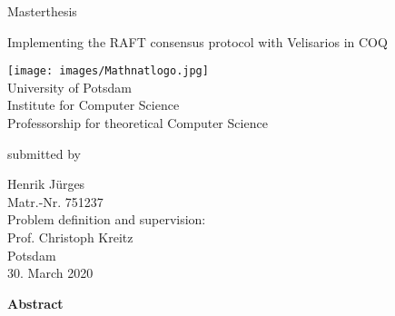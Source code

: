 \documentclass[11pt, a4paper]{article}
\begin{document}
          

\begin{titlepage}
  \begin{center} 
    \mbox{}
    
    {\large \sc Masterthesis} \\    

    \vspace{1cm}
  
    {\huge Implementing the RAFT consensus protocol with Velisarios in COQ\\[1em] {\LARGE}}  
        
    \vspace{2cm}
    
    \texttt{[image: images/Mathnatlogo.jpg]}\\[1em]
    University of Potsdam\\
    Institute for Computer Science\\
    Professorship for theoretical Computer Science
    
    \vspace{2cm}
    
		submitted by
		
    \vspace{1em}
    
		{\Large Henrik Jürges} \\
        {Matr.-Nr. 751237}\\

    \vspace{2em}
        {Problem definition and supervision:}\\
        {Prof. Christoph Kreitz}\\
		
    \vspace{3em}    
    Potsdam\\
    30. March 2020
  \end{center}
\end{titlepage}


\begin{center}
{\bf Abstract}
\end{center}
\noindent

\newpage

\tableofcontents 
\newpage

\newpage
\begin{appendix}


\listoffigures

\newpage
{}
\listoftables
\end{appendix}
\newpage
\end{document}
